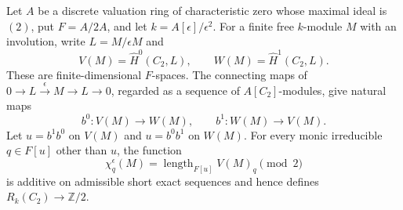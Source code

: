 \begin{lemma}
\label{C:epsilon_Bockstein}
Let $A$ be a discrete valuation ring of characteristic zero whose
maximal ideal is $(2)$, put $F=A/2A$, and let
$k=A[\epsilon]/\epsilon^2$. For a finite free $k$-module $M$ with an
involution, write $L=M/\epsilon M$ and
\[
 V(M)=\widehat H^0(C_2,L),\qquad
 W(M)=\widehat H^1(C_2,L).
\]
These are finite-dimensional $F$-spaces. The connecting maps of
$0\to L\xrightarrow{\epsilon}M\to L\to0$, regarded as a sequence of
$A[C_2]$-modules, give natural maps
\[
 b^0:V(M)\longrightarrow W(M),\qquad
 b^1:W(M)\longrightarrow V(M).
\]
Let $u=b^1b^0$ on $V(M)$ and $u=b^0b^1$ on $W(M)$.
For every monic irreducible $q\in F[u]$ other than $u$, the function
\[
 \chi_q^\epsilon(M)
   =\operatorname{length}_{F[u]}V(M)_q\pmod2               \tag{C.1.9}
\]
is additive on admissible short exact sequences and hence defines
$R_k(C_2)\to\mathbb Z/2$.
\end{lemma}
